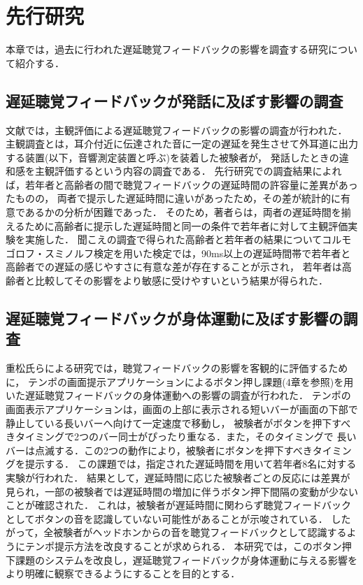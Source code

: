 \chapter{先行研究}
本章では，過去に行われた遅延聴覚フィードバックの影響を調査する研究について紹介する．
\section{遅延聴覚フィードバックが発話に及ぼす影響の調査}
文献\cite{kayama}では，主観評価による遅延聴覚フィードバックの影響の調査が行われた．
主観調査とは，耳介付近に伝達された音に一定の遅延を発生させて外耳道に出力する装置(以下，音響測定装置と呼ぶ)を装着した被験者が，
発話したときの違和感を主観評価するという内容の調査である．
先行研究\cite{kayama}での調査結果によれば，若年者と高齢者の間で聴覚フィードバックの遅延時間の許容量に差異があったものの，
両者で提示した遅延時間に違いがあったため，その差が統計的に有意であるかの分析が困難であった．
そのため，著者らは，両者の遅延時間を揃えるために高齢者に提示した遅延時間と同一の条件で若年者に対して主観評価実験を実施した．
聞こえの調査で得られた高齢者と若年者の結果についてコルモゴロフ・スミノルフ検定を用いた検定では，90ms以上の遅延時間帯で若年者と高齢者での遅延の感じやすさに有意な差が存在することが示され，
若年者は高齢者と比較してその影響をより敏感に受けやすいという結果が得られた．
\section{遅延聴覚フィードバックが身体運動に及ぼす影響の調査}
重松氏らによる研究\cite{shigematu}では，聴覚フィードバックの影響を客観的に評価するために，
テンポの画面提示アプリケーション\cite{Syuuronn-shigematu}によるボタン押し課題(4章を参照)を用いた遅延聴覚フィードバックの身体運動への影響の調査が行われた．
テンポの画面表示アプリケーションは，画面の上部に表示される短いバーが画面の下部で静止している長いバーへ向けて一定速度で移動し，
被験者がボタンを押下すべきタイミングで2つのバー同士がぴったり重なる．また，そのタイミングで
長いバーは点滅する．この2つの動作により，被験者にボタンを押下すべきタイミングを提示する．
この課題では，指定された遅延時間を用いて若年者8名に対する実験が行われた．
結果として，遅延時間に応じた被験者ごとの反応には差異が見られ，一部の被験者では遅延時間の増加に伴うボタン押下間隔の変動が少ないことが確認された．
これは，被験者が遅延時間に関わらず聴覚フィードバックとしてボタンの音を認識していない可能性があることが示唆されている．
したがって，全被験者がヘッドホンからの音を聴覚フィードバックとして認識するようにテンポ提示方法を改良することが求められる．
本研究では，このボタン押下課題のシステムを改良し，遅延聴覚フィードバックが身体運動に与える影響をより明確に観察できるようにすることを目的とする．

